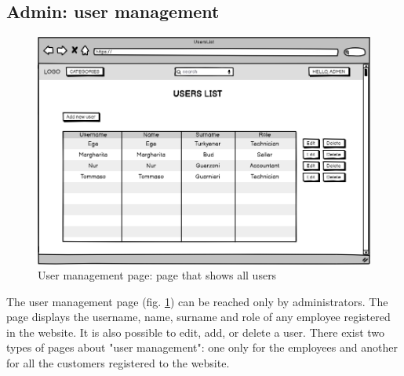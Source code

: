 \subsection{Admin: user management}
    \begin{figure}[H]
        \centering
        \includegraphics[width=\textwidth,height=0.7\textheight,keepaspectratio]{mockups/usersListPageMockup.png}
            \caption{User management page: page that shows all users}
            \label{fig:UserManagement}
    \end{figure}
    The user management page (fig. \ref{fig:UserManagement}) can be reached only by administrators. The page displays the username, name, surname and role of any employee registered in the website. It is also possible to edit, add, or delete a user.
    There exist two types of pages about "user management": one only for the employees and another for all the customers registered to the website.

